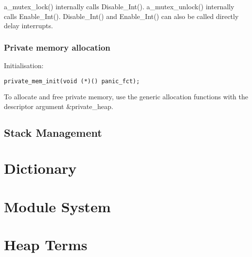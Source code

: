 a_mutex_lock() internally calls Disable_Int().
a_mutex_unlock() internally calls Enable_Int().
Disable_Int() and Enable_Int() can also be called directly
delay interrupts.


\subsubsection{Private memory allocation}

Initialisation:

\begin{verbatim}
private_mem_init(void (*)() panic_fct);
\end{verbatim}

To allocate and free private memory, use the generic allocation functions
with the descriptor argument \&private_heap.

\subsection{Stack Management}

\section{Dictionary}
\section{Module System}
\section{Heap Terms}
